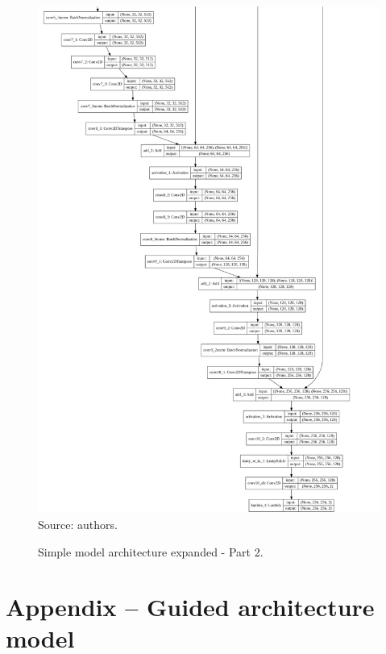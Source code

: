 \documentclass[12pt,openright,oneside,a4paper,english, brazilian]{abntex2}
\begin{document}
\begin{otherlanguage}{english}
\begin{figure}[!htb]
\centering
\caption{Simple model architecture expanded - Part 2.}
\includegraphics[height = \textheight - 1.5cm]{model_plot/Simple2}
\label{simple_plot_2}
Source: authors.
\end{figure}

\chapter{Appendix -- Guided architecture model}


\end{otherlanguage}
\end{document}
